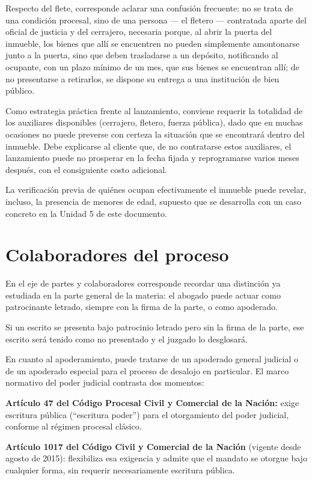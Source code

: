 \documentclass[12pt,oneside]{book}
\begin{document}
Respecto del flete, corresponde aclarar una confusión frecuente: no se trata de una condición procesal, sino de una persona --- el fletero --- contratada aparte del oficial de justicia y del cerrajero, necesaria porque, al abrir la puerta del inmueble, los bienes que allí se encuentren no pueden simplemente amontonarse junto a la puerta, sino que deben trasladarse a un depósito, notificando al ocupante, con un plazo mínimo de un mes, que sus bienes se encuentran allí; de no presentarse a retirarlos, se dispone su entrega a una institución de bien público.

\begin{note}
Como estrategia práctica frente al lanzamiento, conviene requerir la totalidad de los auxiliares disponibles (cerrajero, fletero, fuerza pública), dado que en muchas ocasiones no puede preverse con certeza la situación que se encontrará dentro del inmueble. Debe explicarse al cliente que, de no contratarse estos auxiliares, el lanzamiento puede no prosperar en la fecha fijada y reprogramarse varios meses después, con el consiguiente costo adicional.
\end{note}

La verificación previa de quiénes ocupan efectivamente el inmueble puede revelar, incluso, la presencia de menores de edad, supuesto que se desarrolla con un caso concreto en la Unidad 5 de este documento.

\section{Colaboradores del proceso}

En el eje de partes y colaboradores corresponde recordar una distinción ya estudiada en la parte general de la materia: el abogado puede actuar como patrocinante letrado, siempre con la firma de la parte, o como apoderado.

\begin{important}
Si un escrito se presenta bajo patrocinio letrado pero sin la firma de la parte, ese escrito será tenido como no presentado y el juzgado lo desglosará.
\end{important}

En cuanto al apoderamiento, puede tratarse de un apoderado general judicial o de un apoderado especial para el proceso de desalojo en particular. El marco normativo del poder judicial contrasta dos momentos:

\begin{important}
\textbf{Artículo 47 del Código Procesal Civil y Comercial de la Nación:} exige escritura pública (``escritura poder'') para el otorgamiento del poder judicial, conforme al régimen procesal clásico.

\textbf{Artículo 1017 del Código Civil y Comercial de la Nación} (vigente desde agosto de 2015): flexibiliza esa exigencia y admite que el mandato se otorgue bajo cualquier forma, sin requerir necesariamente escritura pública.
\end{important}
\end{document}
